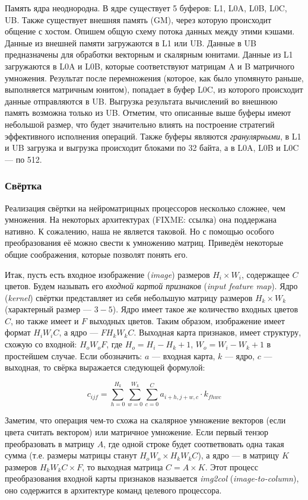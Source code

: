 Память ядра неоднородна. В ядре существует 5 буферов:
L1, L0A, L0B, L0C, UB. Также существует внешняя память (GM), через которую
происходит общение с хостом. Опишем общую схему потока данных между этими кэшами.
Данные из внешней памяти загружаются в L1 или UB. Данные в UB предназначены для
обработки векторным и скалярным юнитами. Данные из L1 загружаются в L0A и L0B,
которые соответствуют матрицам A и B матричного умножения. Результат после
перемножения (которое, как было упомянуто раньше, выполняется матричным юнитом),
попадает в буфер L0C, из которого происходит данные отправляются в UB. Выгрузка
результата вычислений во внешнюю память возможна только из UB. Отметим, что
описанные выше буферы имеют небольшой размер, что будет значительно влиять на
построение стратегий эффективного исполнения операций. Также буферы являются
\textit{гранулярными}, в L1 и UB загрузка и выгрузка происходит блоками по 32
байта, а в L0A, L0B и L0C --- по 512.

\subsubsection{Свёртка}

Реализация свёртки на нейроматрицных процессоров несколько сложнее, чем умножения.
На некоторых архитектурах (FIXME: ссылка) она поддержана нативно. К сожалению, наша
не является таковой. Но с помощью особого преобразования её можно свести к 
умножению матриц. Приведём некоторые общие соображения, которые позволят понять его.

Итак, пусть есть входное изображение (\textit{image}) размеров $H_i \times W_i$,
содержащее $C$ цветов. Будем называть его \textit{входной картой признаков}
(\textit{input feature map}). Ядро (\textit{kernel}) свёртки представляет из
себя небольшую матрицу размеров $H_k \times W_k$ (характерный размер --- $3-5$).
Ядро имеет такое же количество входных цветов $C$, но также имеет и $F$
выходных цветов. Таким образом, изображение имеет формат $H_i W_i C$,
а ядро --- $F H_k W_k C$. Выходная карта признаков, имеет структуру, схожую
со входной: $H_o W_o F$, где $H_o = H_i - H_k + 1$, $W_o = W_i - W_k + 1$
в простейшем случае. Если обозначить: $a$ --- входная карта, $k$ --- ядро,
$c$ --- выходная, то свёрка выражается следующей формулой:

\[
    c_{ijf} = \sum \limits_{h = 0}^{H_k} \sum \limits_{w = 0}^{W_k}
              \sum \limits_{c = 0}^{C} a_{i+h, j+w, c} \cdot k_{f h w c}
\]

Заметим, что операция чем-то схожа на скалярное умножение векторов
(если цвета считать вектором) или матричное умножение. Если первый тензор
преобразовать в матрицу $A$, где одной строке будет соответвовать одна
такая сумма (т.е. размеры матрицы станут $H_o W_o \times H_k W_k C$), а
ядро --- в матрицу $K$ размеров $H_k W_k C \times F$, то выходная
матрица $C = A \times K$. Этот процесс преобразования входной карты
признаков называется \textit{img2col} (\textit{image-to-column}),
оно содержится в архитектуре команд целевого процессора.

